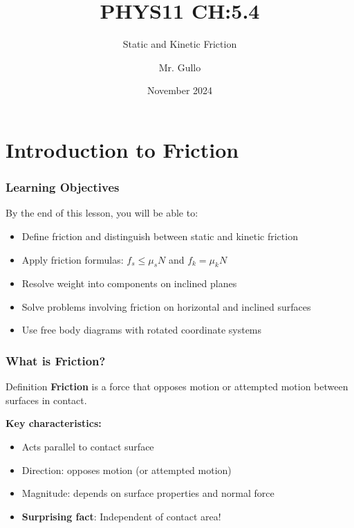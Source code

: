 \documentclass{beamer}
\title[Friction and Inclined Planes]{PHYS11 CH:5.4}
\subtitle{Static and Kinetic Friction}
\author[Mr. Gullo]{Mr. Gullo}
\date[Nov 2024]{November 2024}
\begin{document}
\frame{\titlepage}

\section{Introduction to Friction}

\begin{frame}
\frametitle{Learning Objectives}
By the end of this lesson, you will be able to:
\pause
\begin{itemize}
    \item Define friction and distinguish between static and kinetic friction
    \pause
    \item Apply friction formulas: $f_s \leq \mu_s N$ and $f_k = \mu_k N$
    \pause
    \item Resolve weight into components on inclined planes
    \pause
    \item Solve problems involving friction on horizontal and inclined surfaces
    \pause
    \item Use free body diagrams with rotated coordinate systems
\end{itemize}
\end{frame}

\begin{frame}
\frametitle{What is Friction?}
\begin{block}{Definition}
\textbf{Friction} is a force that opposes motion or attempted motion between surfaces in contact.
\end{block}
\pause

\vspace{1em}
\textbf{Key characteristics:}
\begin{itemize}
    \item Acts parallel to contact surface
    \pause
    \item Direction: opposes motion (or attempted motion)
    \pause
    \item Magnitude: depends on surface properties and normal force
    \pause
    \item \textbf{Surprising fact}: Independent of contact area!
\end{itemize}
\end{frame}
\end{document}
